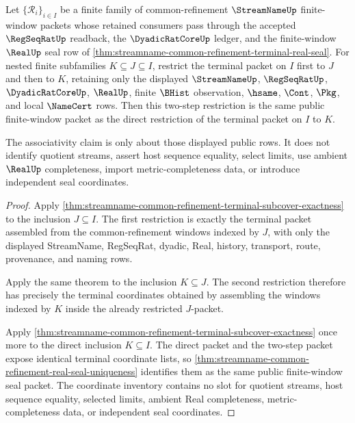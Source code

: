 \begin{theorem}
\label{thm:streamname-common-refinement-terminal-subcover-associativity}
Let $\{\mathcal R_i\}_{i \in I}$ be a finite family of common-refinement $\StreamNameUp$ finite-window packets whose retained consumers pass through the accepted $\RegSeqRatUp$ readback, the $\DyadicRatCoreUp$ ledger, and the finite-window $\RealUp$ seal row of \autoref{thm:streamname-common-refinement-terminal-real-seal}. For nested finite subfamilies $K \subseteq J \subseteq I$, restrict the terminal packet on $I$ first to $J$ and then to $K$, retaining only the displayed $\StreamNameUp$, $\RegSeqRatUp$, $\DyadicRatCoreUp$, $\RealUp$, finite $\BHist$ observation, $\hsame$, $\Cont$, $\Pkg$, and local $\NameCert$ rows. Then this two-step restriction is the same public finite-window packet as the direct restriction of the terminal packet on $I$ to $K$.

The associativity claim is only about those displayed public rows. It does not identify quotient streams, assert host sequence equality, select limits, use ambient $\RealUp$ completeness, import metric-completeness data, or introduce independent seal coordinates.
\end{theorem}
\begin{proof}
Apply \autoref{thm:streamname-common-refinement-terminal-subcover-exactness} to the inclusion $J \subseteq I$. The first restriction is exactly the terminal packet assembled from the common-refinement windows indexed by $J$, with only the displayed StreamName, RegSeqRat, dyadic, Real, history, transport, route, provenance, and naming rows.

Apply the same theorem to the inclusion $K \subseteq J$. The second restriction therefore has precisely the terminal coordinates obtained by assembling the windows indexed by $K$ inside the already restricted $J$-packet.

Apply \autoref{thm:streamname-common-refinement-terminal-subcover-exactness} once more to the direct inclusion $K \subseteq I$. The direct packet and the two-step packet expose identical terminal coordinate lists, so \autoref{thm:streamname-common-refinement-real-seal-uniqueness} identifies them as the same public finite-window seal packet. The coordinate inventory contains no slot for quotient streams, host sequence equality, selected limits, ambient Real completeness, metric-completeness data, or independent seal coordinates.
\end{proof}

